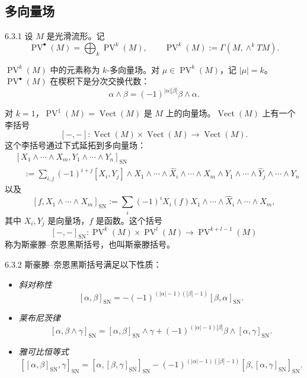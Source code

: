 \subsection{多向量场}

\begin{definition}{6.3.1}
  设 $M$ 是光滑流形。记
  \[
  \operatorname{PV}^\bullet(M)=\bigoplus_k\operatorname{PV}^k(M),
  \qquad
  \operatorname{PV}^k(M):=\Gamma(M,\wedge^kTM).
  \]
\end{definition}

$\operatorname{PV}^k(M)$ 中的元素称为 $k$-多向量场。对 $\mu\in\operatorname{PV}^k(M)$，记 $|\mu|=k$。$\operatorname{PV}^\bullet(M)$ 在楔积下是分次交换代数：
\[
\alpha\wedge\beta=(-1)^{|\alpha||\beta|}\beta\wedge\alpha.
\]

对 $k=1$，$\operatorname{PV}^1(M)=\operatorname{Vect}(M)$ 是 $M$ 上的向量场。$\operatorname{Vect}(M)$ 上有一个李括号
\[
[-,-]:\operatorname{Vect}(M)\times\operatorname{Vect}(M)
\longrightarrow\operatorname{Vect}(M).
\]
这个李括号通过下式延拓到多向量场：
\begin{align*}
&[X_1\wedge\cdots\wedge X_m,Y_1\wedge\cdots\wedge Y_n]_{\mathrm{SN}}\\
&\quad:=\sum_{i,j}(-1)^{i+j}[X_i,Y_j]\wedge
X_1\wedge\cdots\wedge\widehat X_i\wedge\cdots\wedge X_m
\wedge Y_1\wedge\cdots\wedge\widehat Y_j\wedge\cdots\wedge Y_n
\end{align*}
以及
\[
[f,X_1\wedge\cdots\wedge X_m]_{\mathrm{SN}}
:=\sum_i(-1)^iX_i(f)X_1\wedge\cdots\wedge\widehat X_i
\wedge\cdots\wedge X_m,
\]
其中 $X_i,Y_j$ 是向量场，$f$ 是函数。这个括号
\[
[-,-]_{\mathrm{SN}}:\operatorname{PV}^k(M)\times\operatorname{PV}^l(M)
\longrightarrow\operatorname{PV}^{k+l-1}(M)
\]
称为斯豪滕–奈恩黑斯括号，也叫斯豪滕括号。

\begin{proposition}{6.3.2}
  斯豪滕–奈恩黑斯括号满足以下性质：
  \begin{itemize}
    \item \emph{斜对称性}
    \[
    [\alpha,\beta]_{\mathrm{SN}}
    =-(-1)^{(|\alpha|-1)(|\beta|-1)}[\beta,\alpha]_{\mathrm{SN}}.
    \]
    \item \emph{莱布尼茨律}
    \[
    [\alpha,\beta\wedge\gamma]_{\mathrm{SN}}
    =[\alpha,\beta]_{\mathrm{SN}}\wedge\gamma
    +(-1)^{(|\alpha|-1)|\beta|}\beta\wedge[\alpha,\gamma]_{\mathrm{SN}}.
    \]
    \item \emph{雅可比恒等式}
    \[
    [[\alpha,\beta]_{\mathrm{SN}},\gamma]_{\mathrm{SN}}
    =[\alpha,[\beta,\gamma]_{\mathrm{SN}}]_{\mathrm{SN}}
    -(-1)^{(|\alpha|-1)(|\beta|-1)}
    [\beta,[\alpha,\gamma]_{\mathrm{SN}}]_{\mathrm{SN}}.
    \]
  \end{itemize}
\end{proposition}

